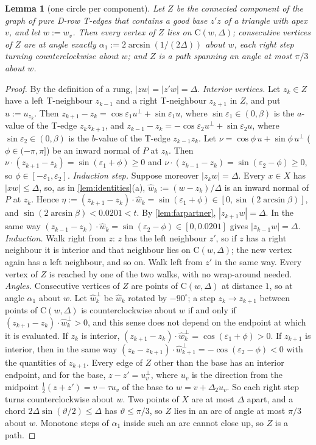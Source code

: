 \documentclass[11pt]{amsart}
\newtheorem{lemma}[theorem]{Lemma}
\theoremstyle{definition}
\theoremstyle{remark}
\newcommand{\Dt}{\Delta_2}
\newcommand{\eps}{\varepsilon}
\newcommand{\Cc}{\mathrm{C}}      %
\begin{document}
\begin{lemma}[one circle per component]\label{lem:onecircle}
Let $Z$ be the connected component of the graph of pure D-row T-edges that contains a good base $z'z$ of a triangle with apex $v$, and let $w:=w_v$. Then every vertex of $Z$ lies on $\Cc(w,\Delta)$; consecutive vertices of $Z$ are at angle exactly $\alpha_1:=2\arcsin(1/(2\Delta))$ about $w$, each right step turning counterclockwise about $w$; and $Z$ is a path spanning an angle at most $\pi/3$ about $w$.
\end{lemma}
\begin{proof}
By the definition of a rung, $|zw|=|z'w|=\Delta$.
\emph{Interior vertices.} Let $z_k\in Z$ have a left T-neighbour $z_{k-1}$ and a right T-neighbour $z_{k+1}$ in $Z$, and put $u:=u_{z_k}$. Then $z_{k+1}-z_k=\cos\eps_1u^\perp+\sin\eps_1u$, where $\sin\eps_1\in(0,\beta)$ is the $a$-value of the T-edge $z_kz_{k+1}$, and $z_{k-1}-z_k=-\cos\eps_2u^\perp+\sin\eps_2u$, where $\sin\eps_2\in(0,\beta)$ is the $b$-value of the T-edge $z_{k-1}z_k$. Let $\nu=\cos\phi\,u+\sin\phi\,u^\perp$ ($\phi\in(-\pi,\pi]$) be an inward normal of $P$ at $z_k$. Then $\nu\cdot(z_{k+1}-z_k)=\sin(\eps_1+\phi)\ge0$ and $\nu\cdot(z_{k-1}-z_k)=\sin(\eps_2-\phi)\ge0$, so $\phi\in[-\eps_1,\eps_2]$.
\emph{Induction step.} Suppose moreover $|z_kw|=\Delta$. Every $x\in X$ has $|xw|\le\Delta$, so, as in \cref{lem:identities}(a), $\hat w_k:=(w-z_k)/\Delta$ is an inward normal of $P$ at $z_k$. Hence $\eta:=(z_{k+1}-z_k)\cdot\hat w_k=\sin(\eps_1+\phi)\in[0,\sin(2\arcsin\beta)]$, and $\sin(2\arcsin\beta)<0.0201<t$. By \cref{lem:farpartner}, $|z_{k+1}w|=\Delta$. In the same way $(z_{k-1}-z_k)\cdot\hat w_k=\sin(\eps_2-\phi)\in[0,0.0201]$ gives $|z_{k-1}w|=\Delta$.
\emph{Induction.} Walk right from $z$: $z$ has the left neighbour $z'$, so if $z$ has a right neighbour it is interior and that neighbour lies on $\Cc(w,\Delta)$; the new vertex again has a left neighbour, and so on. Walk left from $z'$ in the same way. Every vertex of $Z$ is reached by one of the two walks, with no wrap-around needed.
\emph{Angles.} Consecutive vertices of $Z$ are points of $\Cc(w,\Delta)$ at distance $1$, so at angle $\alpha_1$ about $w$. Let $\hat w_k^\perp$ be $\hat w_k$ rotated by $-90^\circ$; a step $z_k\to z_{k+1}$ between points of $\Cc(w,\Delta)$ is counterclockwise about $w$ if and only if $(z_{k+1}-z_k)\cdot\hat w_k^\perp>0$, and this sense does not depend on the endpoint at which it is evaluated. If $z_k$ is interior, $(z_{k+1}-z_k)\cdot\hat w_k^\perp=\cos(\eps_1+\phi)>0$. If $z_{k+1}$ is interior, then in the same way $(z_k-z_{k+1})\cdot\hat w_{k+1}^\perp=-\cos(\eps_2-\phi)<0$ with the quantities of $z_{k+1}$. Every edge of $Z$ other than the base has an interior endpoint, and for the base, $z-z'=u_v^\perp$, where $u_v$ is the direction from the midpoint $\frac12(z+z')=v-\tau u_v$ of the base to $w=v+\Dt u_v$. So each right step turns counterclockwise about $w$. Two points of $X$ are at most $\Delta$ apart, and a chord $2\Delta\sin(\vartheta/2)\le\Delta$ has $\vartheta\le\pi/3$, so $Z$ lies in an arc of angle at most $\pi/3$ about $w$. Monotone steps of $\alpha_1$ inside such an arc cannot close up, so $Z$ is a path.
\end{proof}
\end{document}
